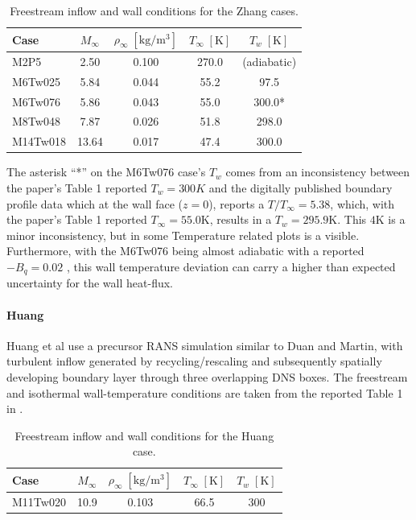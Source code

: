 \begin{table}[H]
    \centering
    \caption{Freestream inflow and wall conditions for the Zhang cases.}
    \label{tab:evaluation:zhang-inflow-wall}
    \begin{tabular}{l S[table-format=2.2] S[table-format=1.3] S[table-format=3.1] S[table-format=3.1,table-space-text-post={*},table-align-text-after=false]}
        \toprule
        Case & {\(M_\infty\)} & {\(\rho_\infty\;[\mathrm{kg}/\mathrm{m}^3]\)} & {\(T_\infty\;[\mathrm{K}]\)} & {\(T_w\;[\mathrm{K}]\)} \\
        \midrule
        M2P5 & 2.50 & 0.100 & 270.0 & {(adiabatic)} \\
        M6Tw025 & 5.84 & 0.044 & 55.2 & 97.5 \\
        M6Tw076 & 5.86 & 0.043 & 55.0 & 300.0{*} \\
        M8Tw048 & 7.87 & 0.026 & 51.8 & 298.0 \\
        M14Tw018 & 13.64 & 0.017 & 47.4 & 300.0 \\
        \bottomrule
    \end{tabular}
\end{table}

The asterisk ``*'' on the M6Tw076 case's \(T_w\) comes from an inconsistency between the paper's Table 1 reported \(T_w = 300 K\) and the digitally published boundary profile data which at the wall face (\(z = 0\)), reports a \(T/T_\infty = 5.38\), which, with the paper's Table 1 reported \(T_\infty = 55.0 \mathrm{K}\), results in a \(T_w = 295.9 \mathrm{K}\). This \(4 \mathrm{K}\) is a minor inconsistency, but in some Temperature related plots is a visible. Furthermore, with the M6Tw076 being almost adiabatic with a reported \(-B_q = 0.02\) \cite[Table 2]{zhang2018direct}, this wall temperature deviation can carry a higher than expected uncertainty for the wall heat-flux.

\paragraph*{Huang}

Huang et al use a precursor RANS simulation similar to Duan and Martin, with turbulent inflow generated by recycling/rescaling and subsequently spatially developing boundary layer through three overlapping DNS boxes. The freestream and isothermal wall-temperature conditions are taken from the reported Table 1 in \cite{huang2020simulation}.

\begin{table}[H]
    \centering
    \caption{Freestream inflow and wall conditions for the Huang case.}
    \label{tab:evaluation:huang-inflow-wall}
    \begin{tabular}{l S[table-format=2.1] S[table-format=1.3] S[table-format=2.1] S[table-format=3.0]}
        \toprule
        Case & {\(M_\infty\)} & {\(\rho_\infty\;[\mathrm{kg}/\mathrm{m}^3]\)} & {\(T_\infty\;[\mathrm{K}]\)} & {\(T_w\;[\mathrm{K}]\)} \\
        \midrule
        M11Tw020 & 10.9 & 0.103 & 66.5 & 300 \\
        \bottomrule
    \end{tabular}
\end{table}

